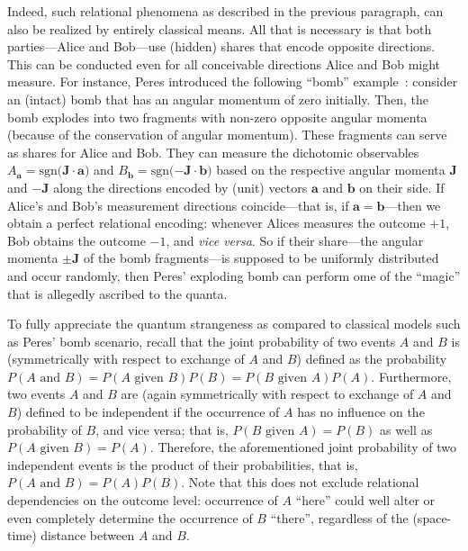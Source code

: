 \documentclass[entropy,article,accept,oneauthor,pdftex]{Definitions/mdpi}
\begin{document}
Indeed, such relational phenomena as described in the previous paragraph, can also be realized by entirely classical means.
All that is necessary is that both parties---Alice and Bob---use (hidden) shares that encode opposite directions.
This can be conducted even for all conceivable directions Alice and Bob might measure.
For instance, Peres introduced the following ``bomb'' example~\cite{peres222}: consider an (intact) bomb that has an angular momentum of zero initially.
Then, the bomb explodes into two fragments with non-zero opposite angular momenta (because of the conservation of angular momentum).
These fragments can serve as shares for Alice and Bob. They can measure the dichotomic {observables}
$A_\mathbf{a}  = \mathrm{sgn} \big( \mathbf{J} \cdot  \mathbf{a}\big)$
and
$B_\mathbf{b}  = \mathrm{sgn} \big( \mathbf{-J} \cdot  \mathbf{b}\big)$
based on the respective angular momenta $\mathbf{J}$ and $-\mathbf{J}$ along the directions encoded by (unit) vectors $\mathbf{a}$ and $\mathbf{b}$ on their side.
If Alice's and Bob's measurement directions coincide---that is, if $\mathbf{a}=\mathbf{b}$---then we obtain a perfect relational encoding:
whenever Alices measures the outcome $+1$, Bob obtains the outcome $-1$, and {\it {vice versa}}.
So if their share---the angular momenta  $\pm \mathbf{J}$ of the bomb fragments---is supposed to be uniformly distributed and occur randomly,
then Peres' exploding bomb can perform ome of the ``magic'' that is allegedly ascribed to the quanta.


To fully appreciate the quantum strangeness as compared to classical models such as Peres' bomb scenario,
recall that the joint probability of two events $A$ and $B$ is (symmetrically with respect to exchange of  $A$ and $B$)
defined as the probability
$P(A \text{ and } B) = P(A \text{ given } B)  P(B) = P(B \text{ given } A)  P(A)$.
Furthermore, two events $A$ and $B$ are (again symmetrically with respect to exchange of  $A$ and $B$) defined to be independent if the
occurrence of $A$ has no influence on the probability of $B$, and vice versa; that is, $P(B \text{ given } A)  = P(B)$ as well as $P(A \text{ given } B)  = P(A)$.
Therefore, the aforementioned joint probability of two independent events is the product of their probabilities,
that is, $P(A \text{ and } B) = P(A)  P(B)$.
Note that this does not exclude relational dependencies on the outcome level: occurrence of $A$ ``here''
could well alter or even completely determine the occurrence of $B$ ``there'', regardless of the (space-time) distance between $A$ and $B$.
\end{document}
